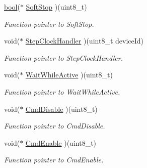 \begin{DoxyCompactItemize}
\mbox{\hyperlink{group___motor___boolean___type_ga0ecf26b576b9a54eca656b9be7ba6a06}{bool}}($\ast$ \mbox{\hyperlink{structmotor_drv__t_a49de3f6a7489c5df4f8c3c1c11b98bf4}{Soft\+Stop}} )(uint8\+\_\+t)
\begin{DoxyCompactList}\small\item\em Function pointer to Soft\+Stop. \end{DoxyCompactList}\item 
\mbox{\label{structmotor_drv__t_a9fedff6ee533edfc8a75ca5e4fbe2ea5}} 
void($\ast$ \mbox{\hyperlink{structmotor_drv__t_a9fedff6ee533edfc8a75ca5e4fbe2ea5}{Step\+Clock\+Handler}} )(uint8\+\_\+t device\+Id)
\begin{DoxyCompactList}\small\item\em Function pointer to Step\+Clock\+Handler. \end{DoxyCompactList}\item 
\mbox{\label{structmotor_drv__t_a4648533c2f0a7d304f8aa4fc1810024b}} 
void($\ast$ \mbox{\hyperlink{structmotor_drv__t_a4648533c2f0a7d304f8aa4fc1810024b}{Wait\+While\+Active}} )(uint8\+\_\+t)
\begin{DoxyCompactList}\small\item\em Function pointer to Wait\+While\+Active. \end{DoxyCompactList}\item 
\mbox{\label{structmotor_drv__t_a740c93c53fa9671d2e76c430ccfa5d2f}} 
void($\ast$ \mbox{\hyperlink{structmotor_drv__t_a740c93c53fa9671d2e76c430ccfa5d2f}{Cmd\+Disable}} )(uint8\+\_\+t)
\begin{DoxyCompactList}\small\item\em Function pointer to Cmd\+Disable. \end{DoxyCompactList}\item 
\mbox{\label{structmotor_drv__t_a605ce46f3786e1eea7b173905440832b}} 
void($\ast$ \mbox{\hyperlink{structmotor_drv__t_a605ce46f3786e1eea7b173905440832b}{Cmd\+Enable}} )(uint8\+\_\+t)
\begin{DoxyCompactList}\small\item\em Function pointer to Cmd\+Enable. \end{DoxyCompactList}\item 
\mbox{\label{structmotor_drv__t_a8d55886dbf2c2c18fdd01f3028a93c07}} 

\end{DoxyCompactItemize}
